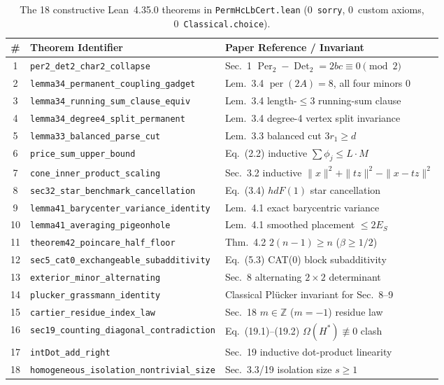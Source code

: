 \documentclass[10pt,twocolumn]{article}
\begin{document}
\begin{table}[t]
\centering
\tiny
\setlength{\tabcolsep}{3pt}
\caption{The 18 constructive Lean~4.35.0 theorems in \texttt{PermHcLbCert.lean} (0~\texttt{sorry}, 0~custom axioms, 0~\texttt{Classical.choice}).}
\label{tab:lean}
\begin{tabular}{@{}cll@{}}
\toprule
\# & Theorem Identifier & Paper Reference / Invariant \\
\midrule
1 & \texttt{per2\_det2\_char2\_collapse} & Sec.~1 $\operatorname{Per}_2 - \operatorname{Det}_2 = 2bc \equiv 0\pmod 2$ \\
2 & \texttt{lemma34\_permanent\_coupling\_gadget} & Lem.~3.4 $\operatorname{per}(2A){=}8$, all four minors $0$ \\
3 & \texttt{lemma34\_running\_sum\_clause\_equiv} & Lem.~3.4 length-$\le 3$ running-sum clause \\
4 & \texttt{lemma34\_degree4\_split\_permanent} & Lem.~3.4 degree-4 vertex split invariance \\
5 & \texttt{lemma33\_balanced\_parse\_cut} & Lem.~3.3 balanced cut $3r_1 \ge d$ \\
6 & \texttt{price\_sum\_upper\_bound} & Eq.~(2.2) inductive $\sum\phi_j \le L\cdot M$ \\
7 & \texttt{cone\_inner\_product\_scaling} & Sec.~3.2 inductive $\|x\|^2{+}\|tz\|^2{-}\|x{-}tz\|^2$ \\
8 & \texttt{sec32\_star\_benchmark\_cancellation} & Eq.~(3.4) $hdF(1)$ star cancellation \\
9 & \texttt{lemma41\_barycenter\_variance\_identity} & Lem.~4.1 exact barycentric variance \\
10 & \texttt{lemma41\_averaging\_pigeonhole} & Lem.~4.1 smoothed placement $\le 2E_S$ \\
11 & \texttt{theorem42\_poincare\_half\_floor} & Thm.~4.2 $2(n-1) \ge n$ ($\beta \ge 1/2$) \\
12 & \texttt{sec5\_cat0\_exchangeable\_subadditivity} & Eq.~(5.3) CAT(0) block subadditivity \\
13 & \texttt{exterior\_minor\_alternating} & Sec.~8 alternating $2\times 2$ determinant \\
14 & \texttt{plucker\_grassmann\_identity} & Classical Pl\"ucker invariant for Sec.~8--9 \\
15 & \texttt{cartier\_residue\_index\_law} & Sec.~18 $m\in\mathbb{Z}$ ($m{=}-1$) residue law \\
16 & \texttt{sec19\_counting\_diagonal\_contradiction} & Eq.~(19.1)--(19.2) $\Omega(H^*)\not\equiv 0$ clash \\
17 & \texttt{intDot\_add\_right} & Sec.~19 inductive dot-product linearity \\
18 & \texttt{homogeneous\_isolation\_nontrivial\_size} & Sec.~3.3/19 isolation size $s\ge 1$ \\
\bottomrule
\end{tabular}
\end{table}
\end{document}

